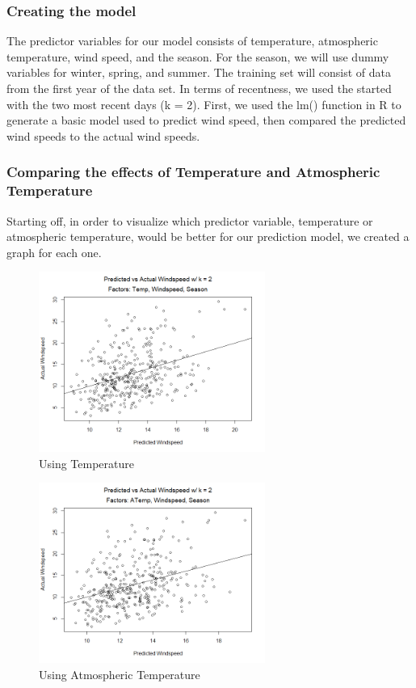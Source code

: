 \documentclass[12pt]{article}
\begin{document}
\subsubsection{Creating the model}

The predictor variables for our model consists of temperature, atmospheric temperature, wind speed, and the season. For the season, we will use dummy variables for winter, spring, and summer. The training set will consist of data from the first year of the data set. In terms of recentness, we used the started with the two most recent days (k = 2). First, we used the lm() function in R to generate a basic model used to predict wind speed, then compared the predicted wind speeds to the actual wind speeds.

\subsubsection{Comparing the effects of Temperature and Atmospheric Temperature}
Starting off, in order to visualize which predictor variable, temperature or atmospheric temperature, would be better for our prediction model, we created a graph for each one.

\begin{figure} [H]
	\centering
  	\includegraphics[width=74mm]{TempWs.png}
 	\caption{Using Temperature}
 	\label{fig:tvws}
\end{figure} 

\begin{figure} [!h]
	\centering
  	\includegraphics[width=74mm]{AtempWs.png}
 	\caption{Using Atmospheric Temperature}
 	\label{fig:atvws}
\end{figure} 
\end{document}

